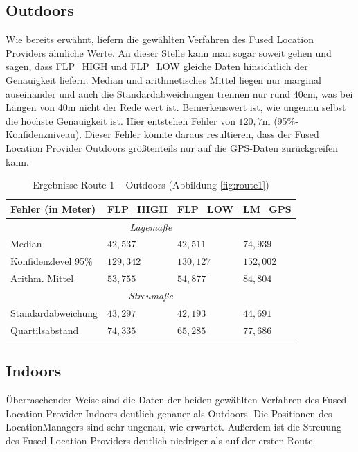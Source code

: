 \subsection{Outdoors}

Wie bereits erwähnt, liefern die gewählten Verfahren des Fused Location Providers ähnliche Werte. An dieser Stelle kann man sogar soweit gehen und sagen, dass FLP\_HIGH und FLP\_LOW gleiche Daten hinsichtlich der Genauigkeit liefern. Median und arithmetisches Mittel liegen nur marginal auseinander und auch die Standardabweichungen trennen nur rund 40cm, was bei Längen von 40m nicht der Rede wert ist. Bemerkenswert ist, wie ungenau selbst die höchste Genauigkeit ist. Hier entstehen Fehler von $120,7$m (95\%-Konfidenzniveau). Dieser Fehler könnte daraus resultieren, dass der Fused Location Provider Outdoors größtenteils nur auf die GPS-Daten zurückgreifen kann.

\renewcommand{\arraystretch}{1.2}
\begin{table}[h!]
	\centering
	\caption{Ergebnisse Route 1 -- Outdoors (Abbildung \ref{fig:route1})}
	\begin{tabular}{|l|l|l|l|}
	\hline
	Fehler (in Meter) & FLP\_HIGH & FLP\_LOW & LM\_GPS \\
	\hline
	\multicolumn{4}{|c|}{\textit{Lagemaße}}\\
	\hline
	Median & $42,537$ & $42,511$ & $74,939$ \\
	Konfidenzlevel 95\% & $129,342$ & $130,127$ & $152,002$ \\
	Arithm. Mittel & $53,755$ & $54,877$ & $84,804$ \\
	\hline
	\multicolumn{4}{|c|}{\textit{Streumaße}}\\
	\hline
	Standardabweichung & $43,297$ & $42,193$ & $44,691$ \\
	Quartilsabstand & $74,335$ & $65,285$ & $77,686$ \\
	\hline
	\end{tabular}
\end{table}

\subsection{Indoors}

Überraschender Weise sind die Daten der beiden gewählten Verfahren des Fused Location Provider Indoors deutlich genauer als Outdoors. Die Positionen des LocationManagers sind sehr ungenau, wie erwartet. Außerdem ist die Streuung des Fused Location Providers deutlich niedriger als auf der ersten Route.

